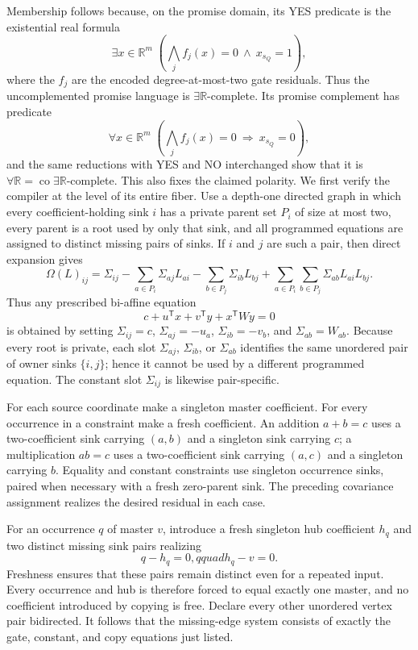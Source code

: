 Membership follows because, on the promise domain, its YES predicate is the existential real formula
\[
\exists x\in\mathbb R^m\;\left(\bigwedge_j f_j(x)=0\ \land\ x_{s_Q}=1\right),
\]
where the \(f_j\) are the encoded degree-at-most-two gate residuals.  Thus the uncomplemented promise language is \(\exists\mathbb R\)-complete.  Its promise complement has predicate
\[
\forall x\in\mathbb R^m\;\left(\bigwedge_j f_j(x)=0\ \Longrightarrow\ x_{s_Q}=0\right),
\]
and the same reductions with YES and NO interchanged show that it is \(\forall\mathbb R=\operatorname{co}\exists\mathbb R\)-complete.  This also fixes the claimed polarity.
We first verify the compiler at the level of its entire fiber.  Use a depth-one directed graph in which every coefficient-holding sink \(i\) has a private parent set \(P_i\) of size at most two, every parent is a root used by only that sink, and all programmed equations are assigned to distinct missing pairs of sinks.  If \(i\) and \(j\) are such a pair, then direct expansion gives
\[
\Omega(L)_{ij}
=\Sigma_{ij}
-\sum_{a\in P_i}\Sigma_{aj}L_{ai}
-\sum_{b\in P_j}\Sigma_{ib}L_{bj}
+\sum_{a\in P_i}\sum_{b\in P_j}\Sigma_{ab}L_{ai}L_{bj}.
\]
Thus any prescribed bi-affine equation
\[
c+u^{\mathsf T}x+v^{\mathsf T}y+x^{\mathsf T}Wy=0
\]
is obtained by setting \(\Sigma_{ij}=c\), \(\Sigma_{aj}=-u_a\), \(\Sigma_{ib}=-v_b\), and \(\Sigma_{ab}=W_{ab}\).  Because every root is private, each slot \(\Sigma_{aj}\), \(\Sigma_{ib}\), or \(\Sigma_{ab}\) identifies the same unordered pair of owner sinks \(\{i,j\}\); hence it cannot be used by a different programmed equation.  The constant slot \(\Sigma_{ij}\) is likewise pair-specific.

For each source coordinate make a singleton master coefficient.  For every occurrence in a constraint make a fresh coefficient.  An addition \(a+b=c\) uses a two-coefficient sink carrying \((a,b)\) and a singleton sink carrying \(c\); a multiplication \(ab=c\) uses a two-coefficient sink carrying \((a,c)\) and a singleton carrying \(b\).  Equality and constant constraints use singleton occurrence sinks, paired when necessary with a fresh zero-parent sink.  The preceding covariance assignment realizes the desired residual in each case.

For an occurrence \(q\) of master \(v\), introduce a fresh singleton hub coefficient \(h_q\) and two distinct missing sink pairs realizing
\[
q-h_q=0,qquad h_q-v=0.
\]
Freshness ensures that these pairs remain distinct even for a repeated input.  Every occurrence and hub is therefore forced to equal exactly one master, and no coefficient introduced by copying is free.  Declare every other unordered vertex pair bidirected.  It follows that the missing-edge system consists of exactly the gate, constant, and copy equations just listed.

